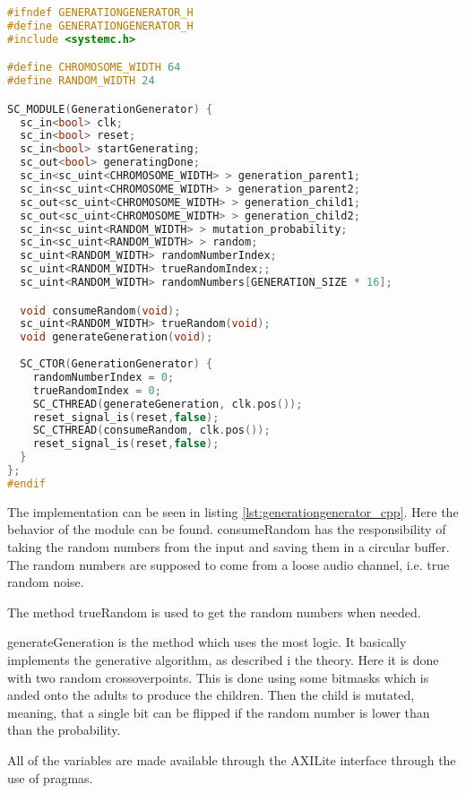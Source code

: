 \begin{lstlisting}[language=C++,caption={GenerationGenerator.h},label={lst:generationgenerator_h}]
#ifndef GENERATIONGENERATOR_H
#define GENERATIONGENERATOR_H
#include <systemc.h>

#define CHROMOSOME_WIDTH 64
#define RANDOM_WIDTH 24

SC_MODULE(GenerationGenerator) {
  sc_in<bool> clk;
  sc_in<bool> reset;
  sc_in<bool> startGenerating;
  sc_out<bool> generatingDone;
  sc_in<sc_uint<CHROMOSOME_WIDTH> > generation_parent1;
  sc_in<sc_uint<CHROMOSOME_WIDTH> > generation_parent2;
  sc_out<sc_uint<CHROMOSOME_WIDTH> > generation_child1;
  sc_out<sc_uint<CHROMOSOME_WIDTH> > generation_child2;
  sc_in<sc_uint<RANDOM_WIDTH> > mutation_probability;
  sc_in<sc_uint<RANDOM_WIDTH> > random;
  sc_uint<RANDOM_WIDTH> randomNumberIndex;
  sc_uint<RANDOM_WIDTH> trueRandomIndex;;
  sc_uint<RANDOM_WIDTH> randomNumbers[GENERATION_SIZE * 16];

  void consumeRandom(void);
  sc_uint<RANDOM_WIDTH> trueRandom(void);
  void generateGeneration(void);
  
  SC_CTOR(GenerationGenerator) {
    randomNumberIndex = 0;
    trueRandomIndex = 0;
    SC_CTHREAD(generateGeneration, clk.pos());
    reset_signal_is(reset,false);
    SC_CTHREAD(consumeRandom, clk.pos());
    reset_signal_is(reset,false);
  }
};
#endif
\end{lstlisting}

The implementation can be seen in listing \ref{lst:generationgenerator_cpp}. Here the behavior of the module can be found. consumeRandom has the responsibility of taking the random numbers from the input and saving them in a circular buffer. The random numbers are supposed to come from a loose audio channel, i.e. true random noise.

The method trueRandom is used to get the random numbers when needed.

generateGeneration is the method which uses the most logic. It basically implements the generative algorithm, as described i the theory. Here it is done with two random crossoverpoints. This is done using some bitmasks which is anded onto the adults to produce the children. Then the child is mutated, meaning, that a single bit can be flipped if the random number is lower than than the probability.

All of the variables are made available through the AXILite interface through the use of pragmas.

